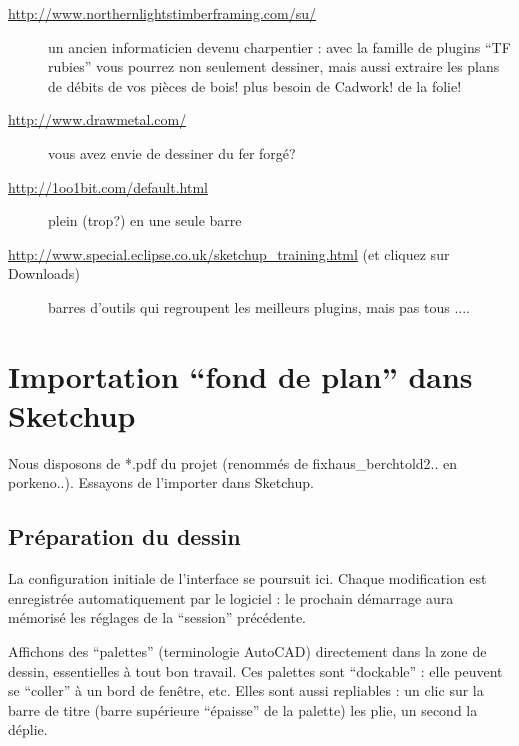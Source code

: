 \documentclass[a4paper,12pt,french]{sphinxmanual}
\begin{document}
\begin{description}
\item[{\url{http://www.northernlightstimberframing.com/su/}}] \leavevmode
un ancien informaticien devenu charpentier : avec la famille de plugins ``TF rubies'' vous pourrez non seulement dessiner, mais aussi extraire les plans de débits de vos pièces de bois! plus besoin de Cadwork! de la folie!

\item[{\url{http://www.drawmetal.com/}}] \leavevmode
vous avez envie de dessiner du fer forgé?

\item[{\url{http://1oo1bit.com/default.html}}] \leavevmode
plein (trop?) en une seule barre

\item[{\url{http://www.special.eclipse.co.uk/sketchup\_training.html} (et cliquez sur Downloads)}]  barres d'outils qui regroupent les meilleurs plugins, mais pas tous ....

\end{description}




\section{Importation ``fond de plan'' dans Sketchup}
\label{su/import-ssqu:import-ssqu}\label{su/import-ssqu::doc}\label{su/import-ssqu:importation-fond-de-plan-dans-sketchup}
Nous disposons de *.pdf du projet (renommés de fixhaus\_berchtold2.. en porkeno..). Essayons de l'importer dans Sketchup.


\subsection{Préparation du dessin}
\label{su/import-ssqu:preparation-du-dessin}
La configuration initiale de l'interface se poursuit ici. Chaque modification est enregistrée automatiquement par le logiciel : le prochain démarrage aura mémorisé les réglages de la ``session'' précédente.

Affichons des ``palettes'' (terminologie AutoCAD) directement dans la zone de dessin, essentielles à tout bon travail. Ces palettes sont ``dockable'' : elle peuvent se ``coller'' à un bord de fenêtre, etc. Elles sont aussi repliables : un clic sur la barre de titre (barre supérieure ``épaisse'' de la palette) les plie, un second la déplie.
\end{document}
